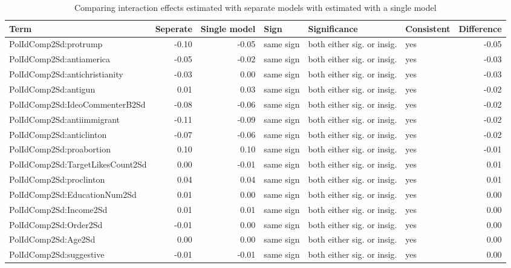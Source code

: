 \begin{table}[!h]
\centering
\caption{\label{tab:interaction-effects-comparison}Comparing interaction effects estimated with separate models with estimated with a single model}
\centering
\begin{tabular}[t]{lrrlllr}
\toprule
Term & Seperate & Single model & Sign & Significance & Consistent & Difference\\
\midrule
PolIdComp2Sd:protrump & -0.10 & -0.05 & same sign & both either sig. or insig. & yes & -0.05\\
\cmidrule{1-7}
PolIdComp2Sd:antiamerica & -0.05 & -0.02 & same sign & both either sig. or insig. & yes & -0.03\\
\cmidrule{1-7}
PolIdComp2Sd:antichristianity & -0.03 & 0.00 & same sign & both either sig. or insig. & yes & -0.03\\
\cmidrule{1-7}
PolIdComp2Sd:antigun & 0.01 & 0.03 & same sign & both either sig. or insig. & yes & -0.02\\
\cmidrule{1-7}
PolIdComp2Sd:IdeoCommenterB2Sd & -0.08 & -0.06 & same sign & both either sig. or insig. & yes & -0.02\\
\cmidrule{1-7}
PolIdComp2Sd:antiimmigrant & -0.11 & -0.09 & same sign & both either sig. or insig. & yes & -0.02\\
\cmidrule{1-7}
PolIdComp2Sd:anticlinton & -0.07 & -0.06 & same sign & both either sig. or insig. & yes & -0.02\\
\cmidrule{1-7}
PolIdComp2Sd:proabortion & 0.10 & 0.10 & same sign & both either sig. or insig. & yes & -0.01\\
\cmidrule{1-7}
PolIdComp2Sd:TargetLikesCount2Sd & 0.00 & -0.01 & same sign & both either sig. or insig. & yes & 0.01\\
\cmidrule{1-7}
PolIdComp2Sd:proclinton & 0.04 & 0.04 & same sign & both either sig. or insig. & yes & 0.01\\
\cmidrule{1-7}
PolIdComp2Sd:EducationNum2Sd & 0.01 & 0.00 & same sign & both either sig. or insig. & yes & 0.00\\
\cmidrule{1-7}
PolIdComp2Sd:Income2Sd & 0.01 & 0.01 & same sign & both either sig. or insig. & yes & 0.00\\
\cmidrule{1-7}
PolIdComp2Sd:Order2Sd & -0.01 & 0.00 & same sign & both either sig. or insig. & yes & 0.00\\
\cmidrule{1-7}
PolIdComp2Sd:Age2Sd & 0.00 & 0.00 & same sign & both either sig. or insig. & yes & 0.00\\
\cmidrule{1-7}
PolIdComp2Sd:suggestive & -0.01 & -0.01 & same sign & both either sig. or insig. & yes & 0.00\\

\end{tabular}
\end{table}
